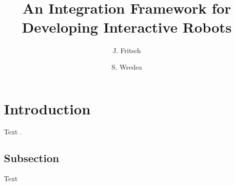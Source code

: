 %
%
%
%









%

\title*{An Integration Framework for Developing Interactive Robots}
\author{J. Fritsch\and S. Wredea}
%
%
\maketitle

\section{Introduction}
\label{sec:ch33-Intro}

Text \cite{33_castek00component}.


\subsection{Subsection}
\label{sec:ch33-subsection}

Text



%
